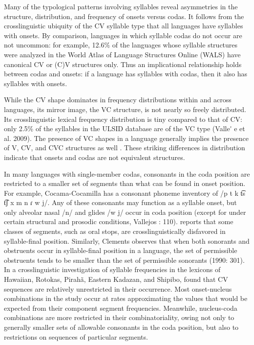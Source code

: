  Many of the typological patterns involving syllables reveal asymmetries in the structure, distribution, and frequency of onsets versus codas. It follows from the crosslinguistic ubiquity of the CV syllable type that all languages have syllables with onsets. By comparison, languages in which syllable codas do not occur are not uncommon: for example, 12.6\% of the languages whose syllable structures were analyzed in the World Atlas of Language Structures Online (WALS) have canonical CV or (C)V structures only. Thus an implicational relationship holds between codas and onsets: if a language has syllables with codas, then it also has syllables with onsets.



  While the CV shape dominates in frequency distributions within and across languages, its mirror image, the VC structure, is not nearly so freely distributed. Its crosslinguistic lexical frequency distribution is tiny compared to that of CV: only 2.5\% of the syllables in the ULSID database are of the VC type (Valle\'{} e et al. 2009). The presence of VC shapes in a language generally implies the presence of V, CV, and CVC structures as well \citep{Blevins1995}. These striking differences in distribution indicate that onsets and codas are not equivalent structures.



  In many languages with single-member codas, consonants in the coda position are restricted to a smaller set of segments than what can be found in onset position. For example, Cocama-Cocamilla has a consonant phoneme inventory of \textsf{/}p t k t͡s t͡ʃ x m n ɾ w j\textsf{/}. Any of these consonants may function as a syllable onset, but only alveolar nasal /n/ and glides /w j/ occur in coda position (except for under certain structural and prosodic conditions, Vallejos \citealt{Yopán2010}: 110). \citet{Krakow1999} reports that some classes of segments, such as oral stops, are crosslinguistically disfavored in syllable-final position. Similarly, Clements observes that when both sonorants and obstruents occur in syllable-final position in a language, the set of permissible obstruents tends to be smaller than the set of permissible sonorants (1990: 301). In a crosslinguistic investigation of syllable frequencies in the lexicons of Hawaiian, Rotokas, Pirahã, Eastern Kadazan, and Shipibo, \citet{MaddiesonPrecoda1992} found that CV sequences are relatively unrestricted in their occurrence. Most onset-nucleus combinations in the study occur at rates approximating the values that would be expected from their component segment frequencies. Meanwhile, nucleus-coda combinations are more restricted in their combinatoriality, owing not only to generally smaller sets of allowable consonants in the coda position, but also to restrictions on sequences of particular segments.



